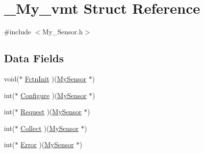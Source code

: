 \hypertarget{struct___my__vmt}{\section{\-\_\-\-My\-\_\-vmt Struct Reference}
\label{struct___my__vmt}
}


{\ttfamily \#include $<$My\-\_\-\-Sensor.\-h$>$}

\subsection*{Data Fields}
\begin{DoxyCompactItemize}
\item 
void($\ast$ \hyperlink{struct___my__vmt_a43f9f9d8e0c1d315836bb28612d18bee}{Fctn\-Init} )(\hyperlink{_my___sensor_8h_aec3fece1ce83f3dd577aa3228199813f}{My\-Sensor} $\ast$)
\item 
int($\ast$ \hyperlink{struct___my__vmt_ae66aa549ba7b48620e02989da56da5a5}{Configure} )(\hyperlink{_my___sensor_8h_aec3fece1ce83f3dd577aa3228199813f}{My\-Sensor} $\ast$)
\item 
int($\ast$ \hyperlink{struct___my__vmt_a2d1dad94e54417934087cf76a8e32245}{Request} )(\hyperlink{_my___sensor_8h_aec3fece1ce83f3dd577aa3228199813f}{My\-Sensor} $\ast$)
\item 
int($\ast$ \hyperlink{struct___my__vmt_a886b58b662a06712e400abefd0d5d677}{Collect} )(\hyperlink{_my___sensor_8h_aec3fece1ce83f3dd577aa3228199813f}{My\-Sensor} $\ast$)
\item 
int($\ast$ \hyperlink{struct___my__vmt_a7fd6e75b116d4744299ececa6286d274}{Error} )(\hyperlink{_my___sensor_8h_aec3fece1ce83f3dd577aa3228199813f}{My\-Sensor} $\ast$)
\end{DoxyCompactItemize}


